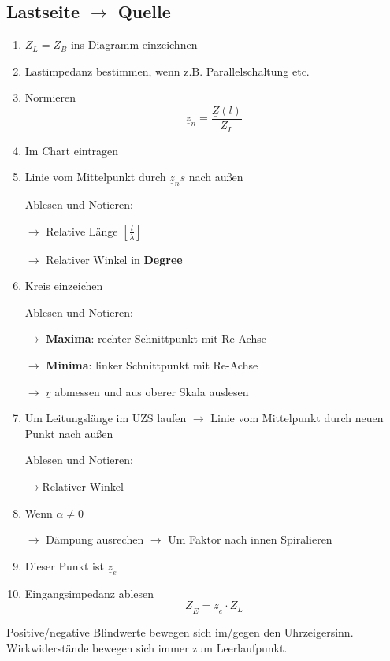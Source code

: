 \subsection[Von Last zu Quelle]{Lastseite $\rightarrow$ Quelle}
\begin{enumerate}
    \item $Z_L = Z_B$ ins Diagramm einzeichnen
    \item Lastimpedanz bestimmen,
          wenn z.B. Parallelschaltung etc.
    \item Normieren
          \[\underline{z}_n = \frac{\underline{Z}(l)}{Z_L} \]
    \item Im Chart eintragen
    \item Linie vom Mittelpunkt durch $\underline{z}_ns$ nach außen

          Ablesen und Notieren:

          $\rightarrow$ Relative Länge $\left[\frac{l}{\lambda}\right]$

          $\rightarrow$ Relativer Winkel in \textbf{Degree}
    \item Kreis einzeichen

          Ablesen und Notieren:

          $\rightarrow$ \textbf{Maxima}: rechter Schnittpunkt mit Re-Achse

          $\rightarrow$ \textbf{Minima}: linker Schnittpunkt mit Re-Achse

          $\rightarrow$ $ \underline{r} $ abmessen und aus oberer Skala auslesen
    \item Um Leitungslänge im UZS laufen
          $\rightarrow$ Linie vom Mittelpunkt durch neuen Punkt nach außen

          Ablesen und Notieren:

          $\rightarrow$Relativer Winkel
    \item Wenn $\alpha\neq 0$

          $\rightarrow$ Dämpung ausrechen
          $\rightarrow$ Um Faktor nach innen Spiralieren

    \item Dieser Punkt ist $\underline{z}_e$
    \item Eingangsimpedanz ablesen
          \[\underline{Z}_E = \underline{z}_e \cdot Z_L\]
\end{enumerate}


Positive/negative Blindwerte bewegen sich im/gegen den Uhrzeigersinn. Wirkwiderstände bewegen sich immer zum Leerlaufpunkt.

